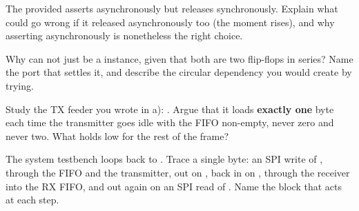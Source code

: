  The provided  asserts asynchronously but releases synchronously. Explain
what could go wrong if it released  asynchronously too (the moment 
rises), and why asserting asynchronously is nonetheless the right choice.

 Why can  not just be a  instance, given that both are two
flip-flops in series? Name the port that settles it, and describe the circular dependency you would
create by trying.

 Study the TX feeder you wrote in a): .
Argue that it loads \textbf{exactly one} byte each time the transmitter goes idle with the FIFO
non-empty, never zero and never two. What holds  low for the rest of the frame?

 The system testbench loops  back to . Trace a single byte: an SPI write
of , through the FIFO and the transmitter, out on , back in on ,
through the receiver into the RX FIFO, and out again on an SPI read of . Name the
block that acts at each step.
